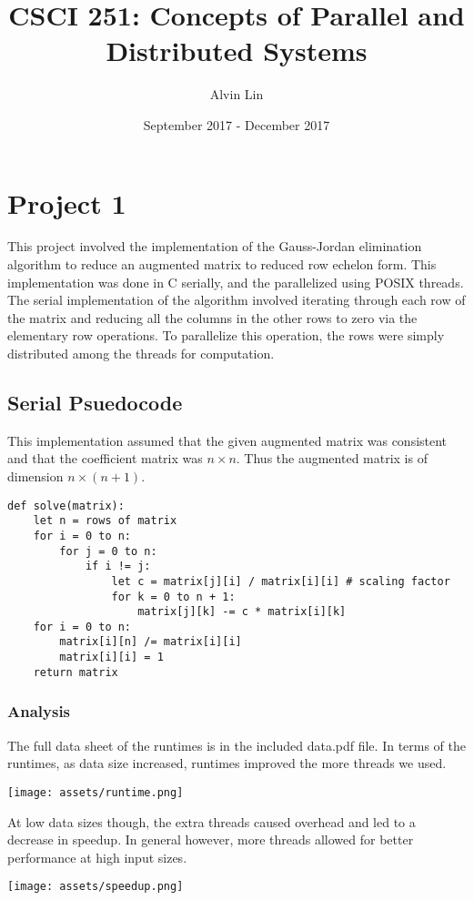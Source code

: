 \documentclass{math}
\title{CSCI 251: Concepts of Parallel and Distributed Systems}
\author{Alvin Lin}
\date{September 2017 - December 2017}
\begin{document}
\maketitle

\section*{Project 1}
This project involved the implementation of the Gauss-Jordan elimination
algorithm to reduce an augmented matrix to reduced row echelon form. This
implementation was done in C serially, and the parallelized using POSIX threads.
The serial implementation of the algorithm involved iterating through each
row of the matrix and reducing all the columns in the other rows to zero via
the elementary row operations. To parallelize this operation, the rows were
simply distributed among the threads for computation.

\subsection*{Serial Psuedocode}
This implementation assumed that the given augmented matrix was consistent
and that the coefficient matrix was \( n\times n \). Thus the augmented matrix
is of dimension \( n\times (n+1) \).
\begin{lstlisting}
def solve(matrix):
    let n = rows of matrix
    for i = 0 to n:
        for j = 0 to n:
            if i != j:
                let c = matrix[j][i] / matrix[i][i] # scaling factor
                for k = 0 to n + 1:
                    matrix[j][k] -= c * matrix[i][k]
    for i = 0 to n:
        matrix[i][n] /= matrix[i][i]
        matrix[i][i] = 1
    return matrix
\end{lstlisting}

\subsubsection*{Analysis}
The full data sheet of the runtimes is in the included data.pdf file.
In terms of the runtimes, as data size increased, runtimes improved the more
threads we used.
\begin{center}
  \texttt{[image: assets/runtime.png]}
\end{center}
At low data sizes though, the extra threads caused overhead and led to a
decrease in speedup. In general however, more threads allowed for better
performance at high input sizes.
\begin{center}
  \texttt{[image: assets/speedup.png]}
\end{center}
\end{document}
